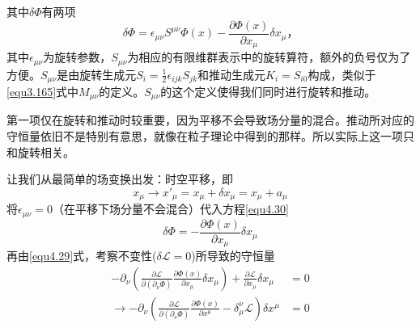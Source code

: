 其中$\delta\Phi$有两项
\begin{equation}
\delta\Phi = \epsilon_{\mu\nu}S^{\mu\nu}\Phi(x)-\frac{\partial\Phi(x)}{\partial x_\mu}\delta x_\mu \text{，}
\label{equ4.30}
\end{equation}
其中$\epsilon_{\mu\nu}$为旋转参数，$S_{\mu\nu}$为相应的有限维群表示中的旋转算符，额外的负号仅为了方便。$S_{\mu\nu}$是由旋转生成元$S_{i}=\frac{1}{2}\epsilon_{ijk}S_{jk}$和推动生成元$K_i=S_{i0}$构成，类似于\ref{equ3.165}式中$M_{\mu\nu}$的定义。$S_{\mu\nu}$的这个定义使得我们同时进行旋转和推动。

第一项仅在旋转和推动时较重要，因为平移不会导致场分量的混合。推动所对应的守恒量依旧不是特别有意思，就像在粒子理论中得到的那样。所以实际上这一项只和旋转相关。

让我们从最简单的场变换出发：时空平移，即
\begin{equation}
x_\mu \rightarrow x'_\mu = x_\mu + \delta x_\mu = x_\mu + a_\mu
\label{equ4.31}
\end{equation}
将$\epsilon_{\mu\nu}=0$（在平移下场分量不会混合）代入方程\ref{equ4.30}
\[
\delta\Phi = -\frac{\partial\Phi(x)}{\partial x_\mu}\delta x_\mu
\]
再由\ref{equ4.29}式，考察不变性($\delta{\mathscr L}=0$)所导致的守恒量
\begin{eqnarray}
-\partial_\nu\left(\frac{\partial\mathscr L}{\partial(\partial_\nu \Phi)}\frac{\partial\Phi(x)}{\partial x_\mu}\delta x_\mu\right) + \frac{\partial\mathscr L}{\partial x_\mu}\delta x_\mu &= 0 \\
\rightarrow -\partial_\nu\left(\frac{\partial\mathscr L}{\partial(\partial_\nu \Phi)}\frac{\partial\Phi(x)}{\partial x^\mu} - \delta_\mu^\nu{\mathscr L}\right) \delta x^\mu &= 0 \label{equ4.33}
\end{eqnarray}

